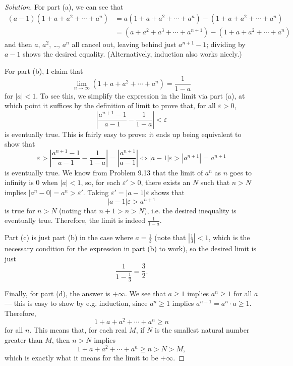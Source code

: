 \documentclass[11pt]{scrartcl}
\providecommand{\eps}{\varepsilon}
\theoremstyle{remark}
\newenvironment{soln}{\begin{proof}[Solution]}{\end{proof}}
\providecommand{\abs}[1]{\left|#1\right|}
\begin{document}
	\begin{soln}
		For part (a), we can see that
		\begin{align*}
			(a - 1)(1 + a + a^2 + \cdots + a^n) &=
			a(1 + a + a^2 + \cdots + a^n) - (1 + a + a^2 + \cdots + a^n)\\
			&= (a + a^2 + a^3 + \cdots + a^{n+1}) - (1 + a + a^2 + \cdots + a^n)
		\end{align*}
		and then $a$, $a^2$, \dots, $a^n$ all cancel out,
		leaving behind just $a^{n+1} - 1$; dividing by $a - 1$
		shows the desired equality.
		(Alternatively, induction also works nicely.)
		
		For part (b), I claim that
		\[\lim_{n\to\infty} (1 + a + a^2 + \cdots + a^n) = \boxed{\frac{1}{1 - a}}\]
		for $|a| < 1$. To see this, we simplify the expression in the limit
		via part (a), at which point it suffices by the definition of limit
		to prove that, for all $\eps > 0$,
		\[\abs{\frac{a^{n + 1} - 1}{a - 1} - \frac{1}{1 - a}} < \eps\]
		is eventually true. This is fairly easy to prove:
		it ends up being equivalent to show that
		\[\eps > \abs{\frac{a^{n + 1} - 1}{a - 1} - \frac{1}{1 - a}}
		= \abs{\frac{a^{n+1}}{a - 1}}
		\iff |a - 1|\eps > |a^{n+1}| = a^{n+1}\]
		is eventually true. We know from Problem 9.13 that the limit of $a^n$
		as $n$ goes to infinity is $0$ when $|a| < 1$, so, for each $\eps' > 0$,
		there exists an $N$ such that $n > N$ implies $|a^n - 0| = a^n > \eps'$.
		Taking $\eps' = |a - 1|\eps$ shows that
		\[|a - 1|\eps > a^{n+1}\]
		is true for $n > N$ (noting that $n + 1 > n > N$),
		i.e. the desired inequality is eventually true.
		Therefore, the limit is indeed $\frac{1}{1 - a}$.
		
		Part (c) is just part (b) in the case where $a = \frac13$
		(note that $|\frac13| < 1$, which is the necessary condition for
		the expression in part (b) to work), so the desired limit is just
		\[\frac{1}{1 - \frac13} = \boxed{\frac32}.\]
		
		Finally, for part (d), the answer is $+\infty$. We see that $a \ge 1$
		implies $a^n\ge 1$ for all $a$ --- this is easy to show by e.g. induction,
		since $a^n \ge 1$ implies $a^{n+1} = a^n\cdot a \ge 1$. Therefore,
		\[1 + a + a^2 + \cdots + a^n \ge n\]
		for all $n$. This means that, for each real $M$, if $N$ is the smallest
		natural number greater than $M$, then $n > N$ implies
		\[1 + a + a^2 + \cdots + a^n \ge n > N > M,\]
		which is exactly what it means for the limit to be $+\infty$.
	\end{soln}
	
\end{document}
